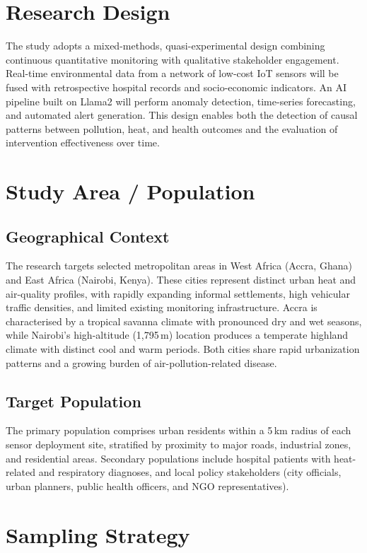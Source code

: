 \documentclass[12pt,a4paper]{report}
\begin{document}
\section{Research Design}
The study adopts a mixed-methods, quasi-experimental design combining continuous quantitative monitoring with qualitative stakeholder engagement. Real-time environmental data from a network of low-cost IoT sensors will be fused with retrospective hospital records and socio-economic indicators. An AI pipeline built on Llama2 will perform anomaly detection, time-series forecasting, and automated alert generation. This design enables both the detection of causal patterns between pollution, heat, and health outcomes and the evaluation of intervention effectiveness over time.

\section{Study Area / Population}

\subsection{Geographical Context}
The research targets selected metropolitan areas in West Africa (Accra, Ghana) and East Africa (Nairobi, Kenya). These cities represent distinct urban heat and air-quality profiles, with rapidly expanding informal settlements, high vehicular traffic densities, and limited existing monitoring infrastructure. Accra is characterised by a tropical savanna climate with pronounced dry and wet seasons, while Nairobi's high-altitude (1,795\,m) location produces a temperate highland climate with distinct cool and warm periods. Both cities share rapid urbanization patterns and a growing burden of air-pollution-related disease.

\subsection{Target Population}
The primary population comprises urban residents within a 5\,km radius of each sensor deployment site, stratified by proximity to major roads, industrial zones, and residential areas. Secondary populations include hospital patients with heat-related and respiratory diagnoses, and local policy stakeholders (city officials, urban planners, public health officers, and NGO representatives).

\section{Sampling Strategy}
\end{document}
